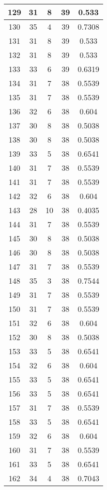 \documentclass[letterpaper, 12pt]{article}
\begin{document}
\begin{longtable}{|c|c|c|c|c|}
\hline
129 & 31 & 8 & 39 & 0.533 \\
\hline
130 & 35 & 4 & 39 & 0.7308 \\
\hline
131 & 31 & 8 & 39 & 0.533 \\
\hline
132 & 31 & 8 & 39 & 0.533 \\
\hline
133 & 33 & 6 & 39 & 0.6319 \\
\hline
134 & 31 & 7 & 38 & 0.5539 \\
\hline
135 & 31 & 7 & 38 & 0.5539 \\
\hline
136 & 32 & 6 & 38 & 0.604 \\
\hline
137 & 30 & 8 & 38 & 0.5038 \\
\hline
138 & 30 & 8 & 38 & 0.5038 \\
\hline
139 & 33 & 5 & 38 & 0.6541 \\
\hline
140 & 31 & 7 & 38 & 0.5539 \\
\hline
141 & 31 & 7 & 38 & 0.5539 \\
\hline
142 & 32 & 6 & 38 & 0.604 \\
\hline
143 & 28 & 10 & 38 & 0.4035 \\
\hline
144 & 31 & 7 & 38 & 0.5539 \\
\hline
145 & 30 & 8 & 38 & 0.5038 \\
\hline
146 & 30 & 8 & 38 & 0.5038 \\
\hline
147 & 31 & 7 & 38 & 0.5539 \\
\hline
148 & 35 & 3 & 38 & 0.7544 \\
\hline
149 & 31 & 7 & 38 & 0.5539 \\
\hline
150 & 31 & 7 & 38 & 0.5539 \\
\hline
151 & 32 & 6 & 38 & 0.604 \\
\hline
152 & 30 & 8 & 38 & 0.5038 \\
\hline
153 & 33 & 5 & 38 & 0.6541 \\
\hline
154 & 32 & 6 & 38 & 0.604 \\
\hline
155 & 33 & 5 & 38 & 0.6541 \\
\hline
156 & 33 & 5 & 38 & 0.6541 \\
\hline
157 & 31 & 7 & 38 & 0.5539 \\
\hline
158 & 33 & 5 & 38 & 0.6541 \\
\hline
159 & 32 & 6 & 38 & 0.604 \\
\hline
160 & 31 & 7 & 38 & 0.5539 \\
\hline
161 & 33 & 5 & 38 & 0.6541 \\
\hline
162 & 34 & 4 & 38 & 0.7043 \\

\end{longtable}
\end{document}
